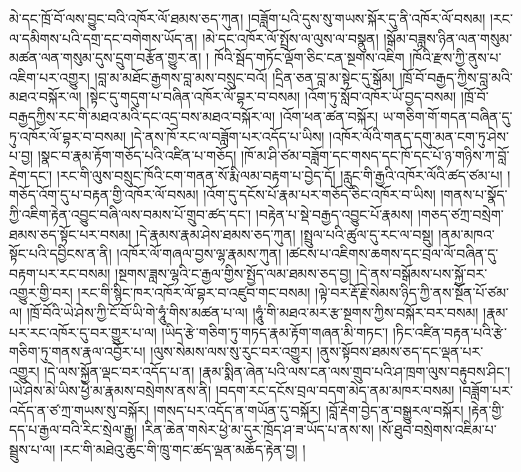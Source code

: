 མེ་དང་ཁྲོ་བོ་ལས་བྱུང་བའི་འཁོར་ལོ་ཐམས་ཅད་ཀུན། །བཟློག་པའི་དུས་སུ་གཡས་སྐོར་དུ་ནི་འཁོར་ལོ་བསམ། །རང་ལ་དམིགས་པའི་དགྲ་དང་བགེགས་ཡོད་ན། །མེ་དང་འཁོར་ལོ་སྤྲོས་ལ་ལུས་ལ་བསྣུན། །སྒོམ་བཟླས་ཉིན་ལན་གསུམ་མཚན་ལན་གསུམ་དུས་དྲུག་བརྩོན་གྱུར་ན། ། ཁོའི་སྦོད་གཏོང་ལྡོག་ཅིང་ངན་སྔགས་འཇིག །ཁོའི་རྫས་ཀྱི་ནུས་པ་འཇིག་པར་འགྱུར། །བླ་མ་མཐོང་རྒྱགས་བླ་མས་བསྲུང་བའོ། །དྲིན་ཅན་བླ་མ་སྟེང་དུ་སྒོམ། །ཁྲོ་བོ་བརྒྱད་ཀྱིས་བླ་མའི་མཐའ་བསྐོར་ལ། །སྟེང་དུ་གདུག་པ་བཞིན་འཁོར་ལོ་བྷར་བ་བསམ། །འོག་ཏུ་སློབ་འཁོར་ཡོ་བྱད་བསམ། །ཁྲོ་བོ་བརྒྱདཀྱིས་རང་གི་མཐའ་མའི་དང་འདྲ་བས་མཐའ་བསྐོར་ལ། །འོག་ཕན་ཚན་བསྐོར། ཡ་གཅིག་གོ་གདན་བཞིན་དུ་ཏུ་འཁོར་ལོ་བྷར་བ་བསམ། །དེ་ནས་ཁོ་རང་ལ་བཟློག་པར་འདོད་པ་ཡིས། །འཁོར་ལོའི་གནད་དགུ་མན་ངག་ཏུ་ཤེས་པ་བྱ། །སྣང་བ་རྣམ་རྟོག་གཅོད་པའི་འཛིན་པ་གཅོད། །ཁོ་མ་ཤི་ཙམ་བཟློག་དང་གསད་དང་ཁོ་དང་པོ་ཉ་གཉིས་ཀ་བློ་རྡེག་དང་། །རང་གི་ལུས་བསྲུང་ཁོའི་ངག་གནན་སོ་རྨི་ལམ་བརྟག་པ་བྱེད་དོ། །རླུང་གི་རྒྱའི་འཁོར་ལོའི་ཚད་ཙམ་པ། །གཅོད་འོག་དུ་པ་བརྟན་གྱི་འཁོར་ལོ་བསམ། །འོག་དུ་དངོས་པོ་རྣམ་པར་གཅོད་ཅིང་འཁོར་བ་ཡིས། །གནས་པ་སྣོད་ཀྱི་འཇིག་རྟེན་འབྱུང་བཞི་ལས་བམས་པོ་གྲུབ་ཚད་དང་། །བརྟེན་པ་སྡེ་བརྒྱད་འབྱུང་པོ་རྣམས། །གཅད་ཙཀྲ་བསྲེག་ཐམས་ཅད་སྟོང་པར་བསམ། །དེ་རྣམས་རྣམ་ཤེས་ཐམས་ཅད་ཀུན། །སྤྲུལ་པའི་ཚུལ་དུ་རང་ལ་བསྡུ། །ནམ་མཁའ་སྟོང་པའི་དབྱིངས་ན་ནི། །འཁོར་ལོ་གཞལ་བྱས་ལྷ་རྣམས་ཀུན། །ཚངས་པ་འཇིགས་ཆགས་དང་བྲལ་ལོ་བཞིན་དུ་བརྟག་པར་རང་བསམ། །སྔགས་ཟླས་ལྷའི་ང་རྒྱལ་གྱིས་སྤྱོད་ལམ་ཐམས་ཅད་བྱ། །དེ་ནས་བསྒོམས་པས་སྐྱོ་བར་འགྱུར་གྱི་བར། །རང་གི་སྙིང་ཁར་འཁོར་ལོ་བྷར་བ་འཛུབ་གང་བསམ། །ལྟེ་བར་རྡོ་རྗེ་སེམས་ཉིད་ཀྱི་ནས་སྔོན་པོ་ཙམ་ལ། །ཁྲོ་བོའི་ཡེ་ཤེས་ཀྱི་ངོ་བོ་ཡི་གེ་ཧཱུཾ་གིས་མཚན་པ་ལ། །ཧཱུཾ་གི་མཐའ་མར་རྩ་སྔགས་ཀྱིས་བསྐོར་བར་བསམ། །རྣམ་པར་རང་འཁོར་དུ་བར་གྱུར་པ་ལ། །ཡིད་རྩེ་གཅིག་ཏུ་གཏད་རྣམ་རྟོག་གཞན་མི་གཏང་། །ཏིང་འཛིན་བརྟན་པའི་རྩེ་གཅིག་ཏུ་གནས་རྣལ་འབྱོར་པ། །ལུས་སེམས་ལས་སུ་རུང་བར་འགྱུར། །ནུས་སྟོབས་ཐམས་ཅད་དང་ལྡན་པར་འགྱུར། །དེ་ལས་སྐྱོན་ལྡང་བར་འདོད་པ་ན། །རྣམ་སྨིན་ཞེན་པའི་ལས་ངན་ལས་གྲུབ་པའི་ཤ་ཁྲག་ལུས་བརྟུབས་ཤིང་། །ཡེ་ཤེས་མེ་ཡིས་ཕྱེ་མ་རྣམས་བསྲེགས་ནས་ནི། །བདག་རང་དངོས་བྲལ་བདག་མེད་ནམ་མཁར་བསམ། །བཟློག་པར་འདོད་ན་ཙ་ཀྲ་གཡས་སུ་བསྐོར། །གསད་པར་འདོད་ན་གཡོན་དུ་བསྐོར། །བློ་རྡེག་བྱེད་ན་བསྒྱུརལ་བསྐོར། །རྟེན་གྱི་དད་པ་རྒྱལ་བའི་རིང་སྲེལ་རྒྱུ། །རིན་ཆེན་གསེར་ཕྱེ་མ་དུར་ཁྲོད་ཤ་ཟ་ཡོད་པ་ནས་ས། །སོ་ཐུབ་བསྲེགས་འཇིམ་པ་སྦྲུས་པ་ལ། །རང་གི་མཐེའུ་ཆུང་གི་ཁྲུ་གང་ཚད་ལྡན་མཆོད་རྟེན་བྱ། །
